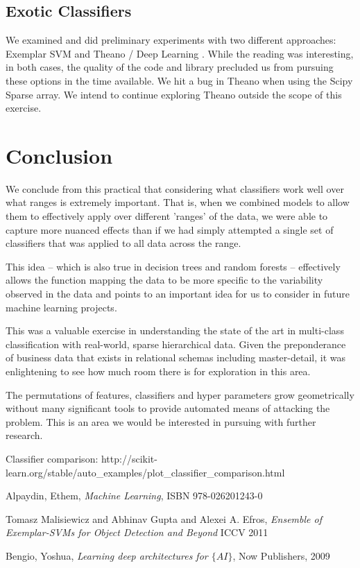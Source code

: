 \documentclass[11pt, oneside]{article}   	%
\begin{document}
\subsection*{Exotic Classifiers}

We examined and did preliminary experiments with two different approaches: Exemplar SVM \cite{exemplar}  and Theano / Deep Learning \cite{deep}. While the reading was interesting, in both cases, the quality of the code and library precluded us from pursuing these options in the time available. We hit a bug in Theano when using the Scipy Sparse array. We intend to continue exploring Theano outside the scope of this exercise.


\section*{Conclusion}

We conclude from this practical that considering what classifiers work well over what ranges is extremely important. That is, when we combined models to allow them to effectively apply over different 'ranges' of the data, we were able to capture more nuanced effects than if we had simply attempted a single set of classifiers that was applied to all data across the range. 

This idea -- which is also true in decision trees and random forests -- effectively allows the function mapping the data to be more specific to the variability observed in the data and points to an important idea for us to consider in future machine learning projects.

This was a valuable exercise in understanding the state of the art in multi-class classification with real-world, sparse hierarchical data. Given the preponderance of business data that exists in relational schemas including master-detail, it was enlightening to see how much room there is for exploration in this area.

The permutations of features, classifiers and hyper parameters grow geometrically without many significant tools to provide automated means of attacking the problem. This is an area we would be interested in pursuing with further research.

\begin{thebibliography}{1}

  Classifier comparison:
  http://scikit-learn.org/stable/auto\_examples/plot\_classifier\_comparison.html
  
   Alpaydin, Ethem, \emph{Machine Learning}, ISBN 978-026201243-0

  Tomasz Malisiewicz and Abhinav Gupta and Alexei A. Efros, \emph{Ensemble of Exemplar-SVMs for Object Detection and Beyond} ICCV 2011

  Bengio, Yoshua, \emph{Learning deep architectures for $\{AI\}$}, Now Publishers, 2009

  \end{thebibliography}
\end{document}
